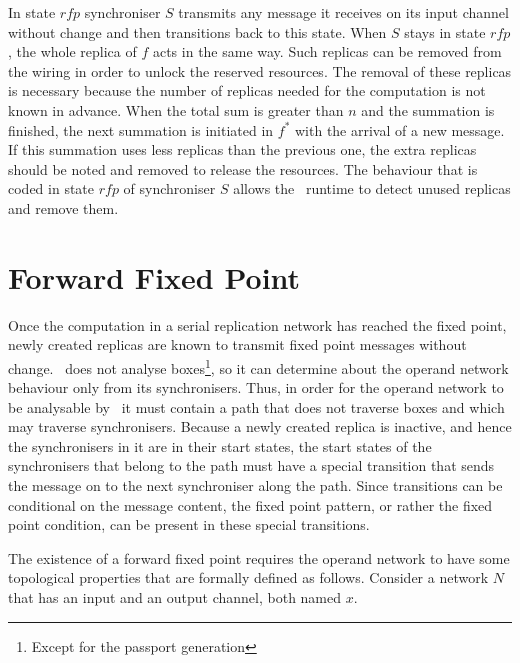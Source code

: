In state $rfp$ synchroniser $S$ transmits any message it receives on its input channel without change and then transitions back to this state. When $S$ stays in state $rfp$, the whole replica of $f$ acts in the same way. Such replicas can be removed from the wiring in order to unlock the reserved resources. The removal of these replicas is necessary because the number of replicas needed for the computation is not known in advance. When the total sum is greater than $n$ and the summation is finished, the next summation is initiated in $f^{*}$ with the arrival of a new message. If this summation uses less replicas than the previous one, the extra replicas should be noted and removed to release the resources. The behaviour that is coded in state $rfp$ of synchroniser $S$ allows the \ak\ runtime to detect unused replicas and remove them.


    \section{Forward Fixed Point}
Once the computation in a serial replication network has reached the fixed point, newly created replicas are known to transmit fixed point messages without change. \ak\ does not analyse boxes\footnote{Except for the  passport generation}, so it can determine about the operand network behaviour only from its synchronisers. Thus, in order for the operand network to be analysable by \ak\, it must contain a path that does not traverse boxes and which may traverse synchronisers. Because a newly created replica is inactive, and hence the synchronisers in it are in their start states, the start states of the synchronisers that belong to the path must have a special transition that sends the message on to the next synchroniser along the path. Since transitions can be conditional on the message content, the fixed point pattern, or rather the fixed point condition, can be present in these special transitions.

The existence of a forward fixed point requires the operand network to have some topological properties that are formally defined as follows. Consider a network $N$ that has an input and an output channel, both named $x$.

